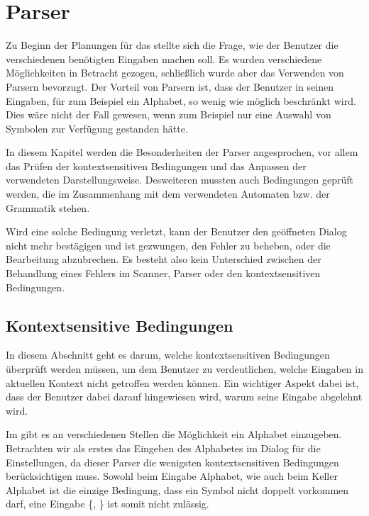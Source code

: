 

\chapter{Parser}\label{Parser}

Zu Beginn der Planungen für das \gtitool stellte sich die Frage, wie der
Benutzer die verschiedenen benötigten Eingaben machen soll. Es wurden
verschiedene Möglichkeiten in Betracht gezogen, schließlich wurde aber das
Verwenden von Parsern bevorzugt. Der Vorteil von Parsern ist, dass der Benutzer
in seinen Eingaben, für zum Beispiel ein Alphabet, so wenig wie möglich
beschränkt wird. Dies wäre nicht der Fall gewesen, wenn zum Beispiel nur eine
Auswahl von Symbolen zur Verfügung gestanden hätte.\vspace{10pt}

In diesem Kapitel werden die Besonderheiten der Parser angesprochen, vor allem
das Prüfen der kontextsensitiven Bedingungen und das Anpassen der verwendeten
Darstellungsweise. Desweiteren mussten auch Bedingungen geprüft werden, die im
Zusammenhang mit dem verwendeten Automaten bzw. der Grammatik
stehen.\vspace{10pt}

Wird eine solche Bedingung verletzt, kann der Benutzer den geöffneten Dialog
nicht mehr bestägigen und ist gezwungen, den Fehler zu beheben, oder die
Bearbeitung abzubrechen. Es besteht also kein Unterschied zwischen der
Behandlung eines Fehlers im Scanner, Parser oder den kontextsensitiven
Bedingungen.


\section{Kontextsensitive Bedingungen}

In diesem Abschnitt geht es darum, welche kontextsensitiven Bedingungen
überprüft werden müssen, um dem Benutzer zu verdeutlichen, welche Eingaben
in aktuellen Kontext nicht getroffen werden können. Ein wichtiger Aspekt dabei
ist, dass der Benutzer dabei darauf hingewiesen wird, warum seine Eingabe
abgelehnt wird.\vspace{10pt}

Im \gtitool gibt es an verschiedenen Stellen die Möglichkeit ein Alphabet
einzugeben. Betrachten wir als erstes das Eingeben des Alphabetes im Dialog für
die Einstellungen, da dieser Parser die wenigsten kontextsensitiven Bedingungen
berücksichtigen muss. Sowohl beim Eingabe Alphabet, wie auch beim Keller
Alphabet ist die einzige Bedingung, dass ein Symbol nicht doppelt vorkommen
darf, eine Eingabe \{, \} ist somit nicht
zulässig.\vspace{10pt}

